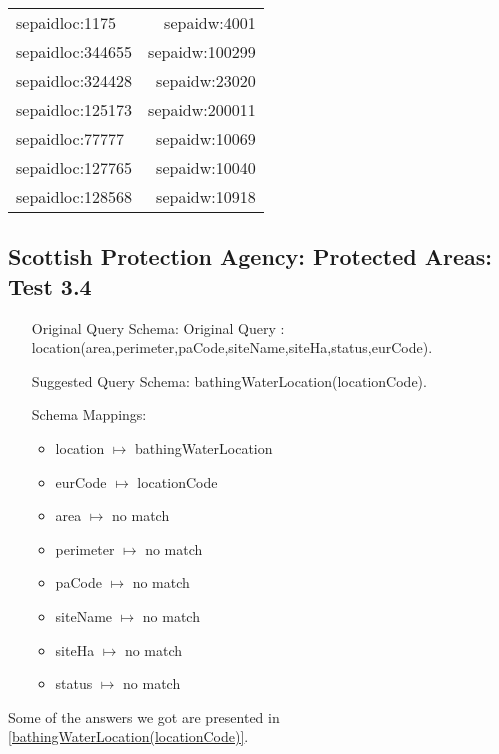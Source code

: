 \documentclass[a4paper,10pt]{article}
\begin{document}
\begin{table}
\begin{center}
\begin{tabular}{ l r}
 sepaidloc:1175   & sepaidw:4001   \\
 sepaidloc:344655 & sepaidw:100299 \\
 sepaidloc:324428 & sepaidw:23020  \\
 sepaidloc:125173 & sepaidw:200011 \\
sepaidloc:77777  & sepaidw:10069  \\
 sepaidloc:127765 & sepaidw:10040  \\
 sepaidloc:128568 & sepaidw:10918  
\end{tabular}
\label{waterBodyMeasures(locationCode,waterBodyId)}
\end{center}
\end{table}
 



\subsection{ Scottish Protection Agency: Protected Areas: Test 3.4}
\label{Test 3.4}

\begin{itemize}
\item[Original Query Schema:] Original Query : location(area,perimeter,paCode,siteName,siteHa,status,eurCode).


\item[Suggested Query Schema: ]
bathingWaterLocation(locationCode).
\item[Schema Mappings:] 
	\begin{itemize}

\item location $\mapsto$ bathingWaterLocation
\item	eurCode $\mapsto$ locationCode
\item area $\mapsto$ no match
\item perimeter $\mapsto$ no match
\item paCode $\mapsto$ no match
\item siteName $\mapsto$ no match
\item siteHa $\mapsto$ no match
\item status $\mapsto$ no match


	\end{itemize}

\end{itemize}
Some of the answers we got are presented in \ref{bathingWaterLocation(locationCode)}.
\end{document}
